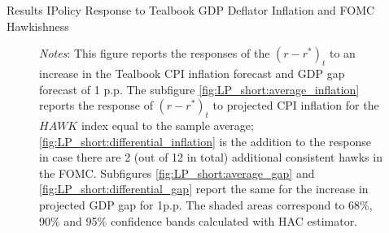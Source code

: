\documentclass[11pt,pdf,aspectratio=129]{beamer}
\begin{document}
\begin{frame}{Results I}{Policy Response to Tealbook GDP Deflator Inflation and FOMC Hawkishness}
\begin{figure}[!htbp]
\begin{minipage}{.9\textwidth}
              {\begin{flushleft}\scriptsize\textit{Notes}: This figure reports the responses of the $(r-r^*)_t$ to an increase in the Tealbook CPI inflation forecast and GDP gap forecast of 1 p.p. The subfigure \ref{fig:LP_short:average_inflation} reports the response of $(r-r^*)_t$ to projected CPI inflation for the $\mathit{HAWK}$ index equal to the sample average; \ref{fig:LP_short:differential_inflation} is the addition to the response in case there are 2 (out of 12 in total) additional consistent hawks in the FOMC. Subfigures \ref{fig:LP_short:average_gap} and \ref{fig:LP_short:differential_gap} report the same for the increase in projected GDP gap for 1p.p. The shaded areas correspond to 68\%, 90\% and 95\% confidence bands calculated with \citet{Andrews1991} HAC estimator.\end{flushleft}}
                  
        \end{minipage}
      \end{figure}
    
\end{frame}
\end{document}
